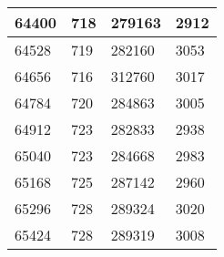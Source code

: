 \begin{longtable}{|l|l|l|l|}
		64400 & 718         & 279163          & 2912             \\ \hline
		64528 & 719         & 282160          & 3053             \\ \hline
		64656 & 716         & 312760          & 3017             \\ \hline
		64784 & 720         & 284863          & 3005             \\ \hline
		64912 & 723         & 282833          & 2938             \\ \hline
		65040 & 723         & 284668          & 2983             \\ \hline
		65168 & 725         & 287142          & 2960             \\ \hline
		65296 & 728         & 289324          & 3020             \\ \hline
		65424 & 728         & 289319          & 3008             \\ \hline
	\end{longtable}

